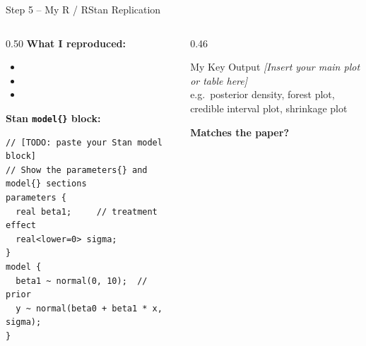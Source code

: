 \documentclass[aspectratio=169,11pt]{beamer}
\begin{document}
\begin{frame}[fragile]{Step 5 -- My R / RStan Replication}

  \begin{columns}[T]
    \begin{column}{0.50\textwidth}
      \textbf{What I reproduced:}
      \begin{itemize}\small
        \item [TODO: model name]
        \item [TODO: real or simulated data?]
        \item [TODO: key result reproduced]
      \end{itemize}

      \vspace{4pt}
      \textbf{Stan \texttt{model\{\}} block:}
\begin{lstlisting}
// [TODO: paste your Stan model block]
// Show the parameters{} and model{} sections
parameters {
  real beta1;     // treatment effect
  real<lower=0> sigma;
}
model {
  beta1 ~ normal(0, 10);  // prior
  y ~ normal(beta0 + beta1 * x, sigma);
}
\end{lstlisting}
    \end{column}

    \begin{column}{0.46\textwidth}
      \begin{block}{My Key Output}
        \vspace{28pt}
        \centering\small
        \textit{[Insert your main plot or table here]}\\
        \tiny
        e.g.\ posterior density, forest plot,\\
        credible interval plot, shrinkage plot
        \vspace{28pt}
      \end{block}
      \vspace{4pt}
      \small
      \textbf{Matches the paper?}\par
      [TODO: Qualitative comparison -- direction,
      magnitude, and uncertainty.]
    \end{column}
  \end{columns}

\end{frame}
\end{document}
